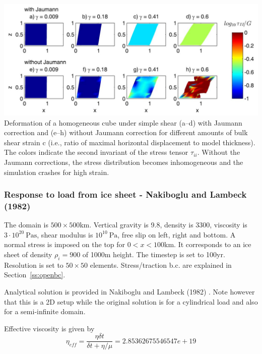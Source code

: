 \begin{center}
\includegraphics[width=15cm]{images/viscoelasticity/vosc15b}\\
{\captionfont Deformation of a homogeneous cube under simple shear (a–d) with 
Jaumann correction and (e–h) without Jaumann correction for different amounts of bulk shear strain c
(i.e., ratio of maximal horizontal displacement to model thickness). The colors indicate 
the second invariant of the stress tensor $\tau_{ii}$. Without the Jaumann corrections, the stress 
distribution becomes inhomogeneous and the simulation crashes for high strain.}
\end{center}





\subsubsection{Response to load from ice sheet - Nakiboglu and Lambeck (1982)}

The domain is $500\times500$km. Vertical gravity is 9.8, density is 3300, viscosity 
is $3\cdot10^{20}~\si{\pascal\second}$, 
shear modulus is $10^{10}~\si{\pascal}$, free slip on left, right and bottom. 
A normal stress is imposed on the top for $0<x<100$km. It corresponds to  
an ice sheet of density $\rho_i=900$ of 1000m height. 
The timestep is set to 100yr. Resolution is set to $50\times50$ elements.
Stress/traction b.c. are explained in Section~\ref{ss:openbc}.

Analytical solution is provided in Nakiboglu and Lambeck (1982) \cite{nala82}. 
Note however that this is a 2D setup while the original solution is for a 
cylindrical load and also for a semi-infinite domain.

Effective viscosity is given by
\[
\eta_{eff} = \frac{\eta \delta t}{\delta t + \eta/\mu}
= 2.85362675546547e+19
\]

